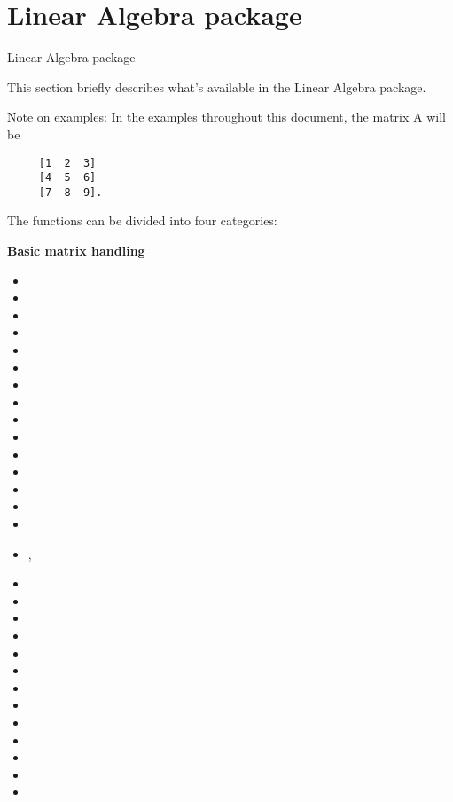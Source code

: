 

\newpage
\section{Linear Algebra package}

\begin{Introduction}{Linear Algebra package}

This section briefly describes what's available in the Linear Algebra
package.

Note on examples: In the examples throughout this
document, the matrix A will be
\begin{verbatim}
     [1  2  3]
     [4  5  6]
     [7  8  9].
\end{verbatim}

The functions can be divided into four categories:

{\bf Basic matrix handling}
 
\begin{itemize} 
\item {}
\item {}
\item {}
\item {}
\item {}
\item {}
\item {}
\item {}
\item {}
\item {}
\item {}
\item {}
\item {}
\item {}
\item {}
\item {} ,
\item {}
\item {}
\item {}
\item {}
\item {}
\item {}
\item {}
\item {}
\item {}
\item {}
\item {}
\item {}
\item {}
\end{itemize}



\end{Introduction}
